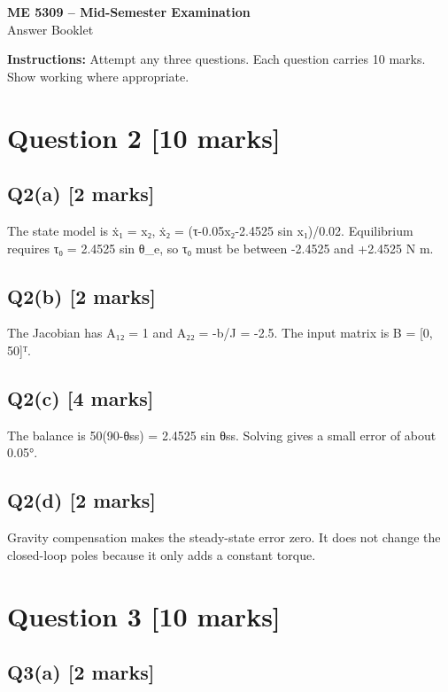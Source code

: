 \documentclass[11pt,a4paper]{article}
\begin{document}
\begin{center}
{\Large\bfseries ME 5309 -- Mid-Semester Examination}\\[3pt]
{\large Answer Booklet}\\[8pt]
\end{center}
\textbf{Instructions:} Attempt any three questions. Each question carries 10 marks. Show working where appropriate.
\section*{Question 2 \hfill [10 marks]}
\subsection*{Q2(a) \hfill [2 marks]}

The state model is ẋ₁ = x₂, ẋ₂ = (τ-0.05x₂-2.4525 sin x₁)/0.02.
Equilibrium requires τ₀ = 2.4525 sin θ\_e, so τ₀ must be between -2.4525 and +2.4525 N m.

\subsection*{Q2(b) \hfill [2 marks]}

The Jacobian has A₁₂ = 1 and A₂₂ = -b/J = -2.5.
The input matrix is B = [0, 50]ᵀ.

\subsection*{Q2(c) \hfill [4 marks]}

The balance is 50(90-θss) = 2.4525 sin θss.
Solving gives a small error of about 0.05°.

\subsection*{Q2(d) \hfill [2 marks]}

Gravity compensation makes the steady-state error zero.
It does not change the closed-loop poles because it only adds a constant torque.

\section*{Question 3 \hfill [10 marks]}
\subsection*{Q3(a) \hfill [2 marks]}
\end{document}
